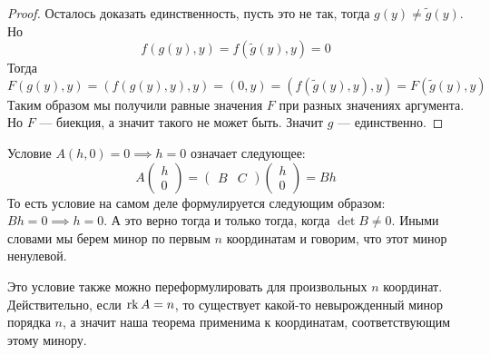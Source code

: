 \begin{proof}
    Осталось доказать единственность, пусть это не так, тогда $g(y) \neq \widetilde{g}(y)$. Но 
    \begin{equation*}
      f(g(y), y) = f(\widetilde{g}(y), y) = 0
    \end{equation*}
    Тогда 
    \begin{equation*}
      F(g(y), y) = (f(g(y), y), y) = (0, y) = (f(\widetilde{g}(y), y), y) = F(\widetilde{g}(y), y)
    \end{equation*}
    Таким образом мы получили равные значения $F$ при разных значениях аргумента. Но $F$ --- биекция, а значит такого не может быть. Значит $g$ --- единственно.
  \end{proof}
  
  \notice \; Условие $A(h, 0) = 0 \implies h = 0$ означает следующее:
  \begin{equation*}
    A \begin{pmatrix}
      h \\ 0
    \end{pmatrix}
    =
    \begin{pmatrix}
      B & C
    \end{pmatrix}
    \begin{pmatrix}
      h \\ 0
    \end{pmatrix}
    =
    Bh
  \end{equation*}
  То есть условие на самом деле формулируется следующим образом: $Bh = 0 \implies h = 0$. А это верно тогда и только тогда, когда $\det B \neq 0$. Иными словами мы берем минор по первым $n$ координатам и говорим, что этот минор ненулевой.
  
  \notice \; Это условие также можно переформулировать для произвольных $n$ координат. Действительно, если $\operatorname{rk} A = n$, то существует какой-то невырожденный минор порядка $n$, а значит наша теорема применима к координатам, соответствующим этому минору.
  